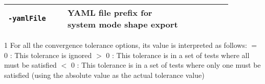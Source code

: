 \begin{threeparttable}[b]
\begin{tabular}{|>{\raggedright} p{0.23\linewidth}| p{0.48\linewidth}| p{0.16\linewidth}|}
  \hline
  \texttt{-yamlFile}  &  YAML file prefix for system mode shape export &   \\
  \hline
\end{tabular}
  \begin{tablenotes}
    \item[1] { For all the convergence tolerance options, its value is interpreted as follows:\newline
      $=$ 0 : This tolerance is ignored\newline
      $>$ 0 : This tolerance is in a set of tests where all must be satisfied\newline
      $<$ 0 : This tolerance is in a set of tests where only one must be satisfied\newline
      (using the absolute value as the actual tolerance value)}
  \end{tablenotes}
\end{threeparttable}

\clearpage



